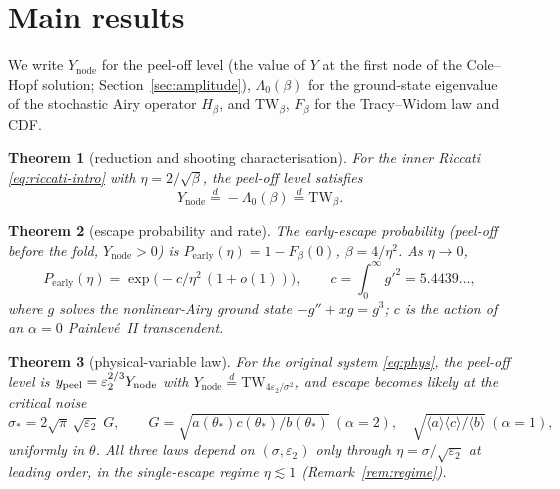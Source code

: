 \documentclass[11pt,reqno]{amsart}
\theoremstyle{plain}
\newtheorem{theorem}{Theorem}
\theoremstyle{definition}
\theoremstyle{remark}
\newcommand{\eqd}{\stackrel{d}{=}}
\newcommand{\TW}{\mathrm{TW}}
\newcommand{\Ynode}{Y_{\mathrm{node}}}
\newcommand{\Pearly}{P_{\mathrm{early}}}
\newcommand{\Lam}{\Lambda_0}
\newcommand{\ep}{\varepsilon}
\begin{document}
\section{Main results}\label{sec:results}

We write $\Ynode$ for the peel-off level (the value of $Y$ at the first node of the
Cole--Hopf solution; Section~\ref{sec:amplitude}), $\Lam(\beta)$ for the ground-state
eigenvalue of the stochastic Airy operator $H_\beta$, and $\TW_\beta$, $F_\beta$ for the
Tracy--Widom law and CDF.

\begin{theorem}[reduction and shooting characterisation]\label{thm:shoot}
For the inner Riccati \eqref{eq:riccati-intro} with $\eta=2/\sqrt\beta$, the peel-off level
satisfies
\[
  \Ynode\eqd-\Lam(\beta)\eqd\TW_\beta .
\]
\end{theorem}

\begin{theorem}[escape probability and rate]\label{thm:escape}
The early-escape probability (peel-off before the fold, $\Ynode>0$) is
$\Pearly(\eta)=1-F_\beta(0)$, $\beta=4/\eta^2$. As $\eta\to0$,
\[
  \Pearly(\eta)=\exp\!\bigl(-c/\eta^2\,(1+o(1))\bigr),\qquad
  c=\int_0^\infty g'^2=5.4439\ldots,
\]
where $g$ solves the nonlinear-Airy ground state $-g''+xg=g^3$; $c$ is the action of an
$\alpha=0$ Painlev\'e~II transcendent.
\end{theorem}

\begin{theorem}[physical-variable law]\label{thm:blowdown}
For the original system \eqref{eq:phys}, the peel-off level is $y_{\rm peel}=
\ep_2^{2/3}\Ynode$ with $\Ynode\eqd\TW_{4\ep_2/\sigma^2}$, and escape becomes likely at the
critical noise
\[
  \sigma_*=2\sqrt\pi\,\sqrt{\ep_2}\;G,\qquad
  G=\sqrt{a(\theta_*)c(\theta_*)/b(\theta_*)}\ (\alpha=2),\quad
  \sqrt{\langle a\rangle\langle c\rangle/\langle b\rangle}\ (\alpha=1),
\]
uniformly in $\theta$. All three laws depend on $(\sigma,\ep_2)$ only through
$\eta=\sigma/\sqrt{\ep_2}$ at leading order, in the single-escape regime $\eta\lesssim1$
(Remark~\ref{rem:regime}).
\end{theorem}
\end{document}
